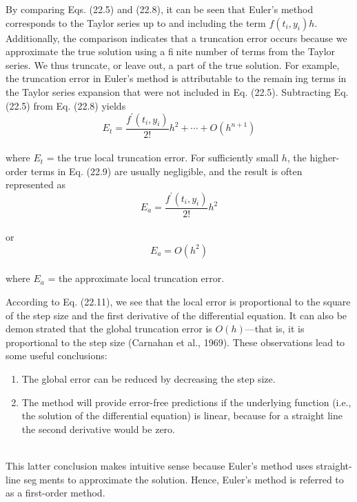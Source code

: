 By comparing Eqs. (22.5) and (22.8), it can be seen that Euler’s method corresponds to the Taylor series up to and including the term $f(t_{i}, y_{i})h$. Additionally, the comparison
indicates that a truncation error occurs because we approximate the true solution using a finite number of terms from the Taylor series. We thus truncate, or leave out, a part of the true
solution. For example, the truncation error in Euler’s method is attributable to the remaining terms in the Taylor series expansion that were not included in Eq. (22.5). Subtracting
Eq. (22.5) from Eq. (22.8) yields\\
\begin{equation}
\tag{22.9}
E_{t} = \dfrac{ f^{'}( t_{i},y_{i} ) }{2!}h^2 + \cdots + O(h^{n+1})
\end{equation}\\
where $E_{t}$ = the true local truncation error. For sufficiently small $h$, the higher-order terms
in Eq. (22.9) are usually negligible, and the result is often represented as\\
\begin{equation}
\tag{22.10}
E_{a} = \dfrac{f^{'} ( t_{i}, y_{i} )}{2!} h^2
\end{equation}\\
or\\
\begin{equation}
\tag{22.11}
E_{a} = O(h^2)
\end{equation}\\
where $E_{a}$ = the approximate local truncation error.

According to Eq. (22.11), we see that the local error is proportional to the square of
the step size and the first derivative of the differential equation. It can also be demonstrated that the global truncation error is $O(h)$—that is, it is proportional to the step size (Carnahan et al., 1969). These observations lead to some useful conclusions:

\begin{enumerate}
\item The global error can be reduced by decreasing the step size.
\item The method will provide error-free predictions if the underlying function (i.e., the
solution of the differential equation) is linear, because for a straight line the second
derivative would be zero.
\end{enumerate}\\
This latter conclusion makes intuitive sense because Euler’s method uses straight-line segments to approximate the solution. Hence, Euler’s method is referred to as a first-order
method.


